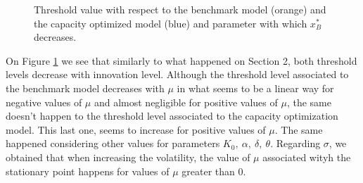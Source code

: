 \begin{figure}[!htb]
	\begin{subfigmatrix}{2}
	\end{subfigmatrix}
	\caption{Threshold value with respect to the benchmark model (orange) and the capacity optimized model (blue) and parameter with which  $x^*_B$ decreases.}
	\label{fig:2_x3}
\end{figure}

On Figure \ref{fig:2_x3} we see that similarly to what happened on Section 2, both threshold levels decrease with innovation level. Although the threshold level associated to the benchmark model decreases with $\mu$ in what seems to be a linear way for negative values of $\mu$ and almost negligible for positive values of $\mu$, the same doesn't happen to the threshold level associated to the capacity optimization model. This last one, seems to increase for positive values of $\mu$. The same happened considering other values for parameters $K_0, \ \alpha, \ \delta, \ \theta$. Regarding $\sigma$, we obtained that when increasing the volatility, the value of $\mu$ associated wityh the stationary point happens for values of $\mu$ greater than 0.

